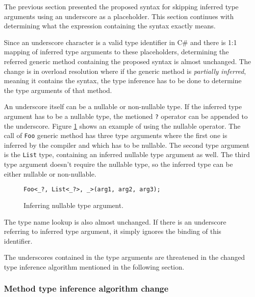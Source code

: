 The previous section presented the proposed syntax for skipping inferred type arguments using an underscore as a placeholder. 
This section continues with determining what the expression containing the syntax exactly means.
\par
Since an underscore character is a valid type identifier in C\# and there is
1:1 mapping of inferred type arguments to these placeholders, determining the referred generic method containing the proposed syntax is almost unchanged. 
The change is in overload resolution where if the generic method is \textit{partially inferred}, meaning it contains the syntax, the type inference has to be done to determine the type arguments of that method.
\par
An underscore itself can be a nullable or non-nullable type. 
If the inferred type argument has to be a nullable type, the metioned \texttt{?} operator can be appended to the underscore. 
Figure \ref{img53:null} shows an example of using the nullable operator. 
The call of \texttt{Foo} generic method has three type arguments where the first one is inferred by the compiler and which has to be nullable. 
The second type argument is the \texttt{List} type, containing an inferred nullable type argument as well. 
The third type argument doesn’t require the nullable type, so the inferred type can be either nullable or non-nullable.
\begin{figure}[h!]
\begin{lstlisting}[style=csharp]
Foo<_?, List<_?>, _>(arg1, arg2, arg3);
\end{lstlisting}
\caption{Inferring nullable type argument.}
\label{img53:null}
\end{figure}
\par
The type name lookup is also almost unchanged. 
If there is an underscore
referring to inferred type argument, it simply ignores the binding of this identifier.
\par
The underscores contained in the type arguments are threatened in the changed type inference algorithm mentioned in the following section.

\subsubsection{Method type inference algorithm change}

